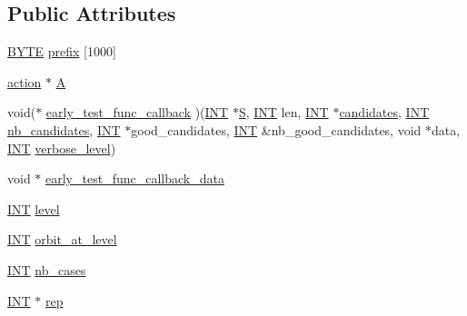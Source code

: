 \subsection*{Public Attributes}
\begin{DoxyCompactItemize}
\item 
\mbox{\hyperlink{galois_8h_ab6cc7b4aeb6ea31aba2b3fbfc83ff5e6}{B\+Y\+TE}} \mbox{\hyperlink{classorbit__rep_a288a6aa3df7449defb3c79d5a7607260}{prefix}} \mbox{[}1000\mbox{]}
\item 
\mbox{\hyperlink{classaction}{action}} $\ast$ \mbox{\hyperlink{classorbit__rep_a22d225352d2bf639efe599eb6d723cbd}{A}}
\item 
void($\ast$ \mbox{\hyperlink{classorbit__rep_ae5c12d9ff50f246a92c63fe78221dbf6}{early\+\_\+test\+\_\+func\+\_\+callback}} )(\mbox{\hyperlink{galois_8h_a09fddde158a3a20bd2dcadb609de11dc}{I\+NT}} $\ast$\mbox{\hyperlink{simeon_8_c_adab47f8243f1b5a2c31df2535d6b37d0}{S}}, \mbox{\hyperlink{galois_8h_a09fddde158a3a20bd2dcadb609de11dc}{I\+NT}} len, \mbox{\hyperlink{galois_8h_a09fddde158a3a20bd2dcadb609de11dc}{I\+NT}} $\ast$\mbox{\hyperlink{classorbit__rep_ad0df86e7ddfadb6f059011f8251a14ae}{candidates}}, \mbox{\hyperlink{galois_8h_a09fddde158a3a20bd2dcadb609de11dc}{I\+NT}} \mbox{\hyperlink{classorbit__rep_a939fbf3e70ac58f85bd5dfd8365f3978}{nb\+\_\+candidates}}, \mbox{\hyperlink{galois_8h_a09fddde158a3a20bd2dcadb609de11dc}{I\+NT}} $\ast$good\+\_\+candidates, \mbox{\hyperlink{galois_8h_a09fddde158a3a20bd2dcadb609de11dc}{I\+NT}} \&nb\+\_\+good\+\_\+candidates, void $\ast$data, \mbox{\hyperlink{galois_8h_a09fddde158a3a20bd2dcadb609de11dc}{I\+NT}} \mbox{\hyperlink{simeon_8_c_a818073fbcc2f439e7c56952f67386122}{verbose\+\_\+level}})
\item 
void $\ast$ \mbox{\hyperlink{classorbit__rep_a4190d1ceef69ca81b0a2720d6f7abbe6}{early\+\_\+test\+\_\+func\+\_\+callback\+\_\+data}}
\item 
\mbox{\hyperlink{galois_8h_a09fddde158a3a20bd2dcadb609de11dc}{I\+NT}} \mbox{\hyperlink{classorbit__rep_ae6a58248c3905598f5c711b6c9d3264e}{level}}
\item 
\mbox{\hyperlink{galois_8h_a09fddde158a3a20bd2dcadb609de11dc}{I\+NT}} \mbox{\hyperlink{classorbit__rep_adc16a8c6fc9a121888b07d811c7d5b55}{orbit\+\_\+at\+\_\+level}}
\item 
\mbox{\hyperlink{galois_8h_a09fddde158a3a20bd2dcadb609de11dc}{I\+NT}} \mbox{\hyperlink{classorbit__rep_adae86c13d1a9078b30e8c27bb5e1541a}{nb\+\_\+cases}}
\item 
\mbox{\hyperlink{galois_8h_a09fddde158a3a20bd2dcadb609de11dc}{I\+NT}} $\ast$ \mbox{\hyperlink{classorbit__rep_a67d318af0ad6f7d7f2094e50801501b7}{rep}}

\end{DoxyCompactItemize}
